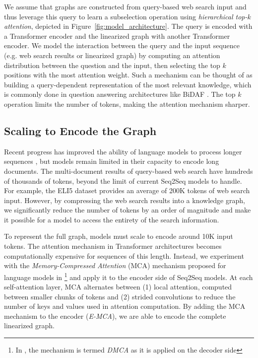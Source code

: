 \documentclass[11pt,a4paper]{article}
\begin{document}
We assume that graphs are constructed from query-based web search input and thus leverage this query to learn a subselection operation using \textit{hierarchical top-$k$ attention}, depicted in Figure~\ref{fig:model_architecture}. The query is encoded with a Transformer encoder and the linearized graph with another Transformer encoder. We model the interaction between the query and the input sequence (e.g. web search results or linearized graph) by computing an attention distribution between the question and the input, then selecting the top $k$ positions with the most attention weight. Such a mechanism can be thought of as building a query-dependent representation of the most relevant knowledge, which is commonly done in question answering architectures like BiDAF \cite{seo2017bidirectional}. The top $k$ operation limits the number of tokens, making the attention mechanism sharper. 

\subsection{Scaling to Encode the Graph} 

Recent progress has improved the ability of language models to process longer sequences \cite{sukhbaatar2019adaptive,dai2019transformer}, but models remain limited in their capacity to encode long documents. The multi-document results of query-based web search have hundreds of thousands of tokens, beyond the limit of current Seq2Seq models to handle. For example, the ELI5 dataset provides an average of 200K tokens of web search input. However, by compressing the web search results into a knowledge graph, we significantly reduce the number of tokens by an order of magnitude and make it possible for a model to access the entirety of the search information.

To represent the full graph, models must scale to encode around 10K input tokens. The attention mechanism in Transformer architectures becomes  computationally expensive for sequences of this length. Instead, we experiment with the \textit{Memory-Compressed Attention} (MCA) mechanism proposed for language models in \cite{liu2018generating}\footnote{In \cite{liu2018generating}, the mechanism is termed \textit{DMCA} as it is applied on the decoder side} and apply it to the encoder side of Seq2Seq models. At each self-attention layer, MCA alternates between (1) local attention, computed between smaller chunks of tokens and (2) strided convolutions to reduce the number of keys and values used in attention computation. By adding the MCA mechanism to the encoder (\textit{E-MCA}), we are able to encode the complete linearized graph.
\end{document}
